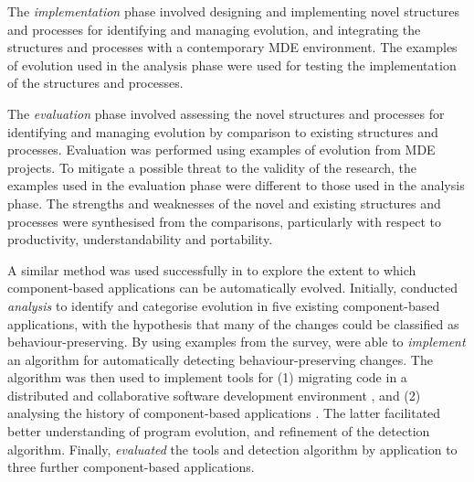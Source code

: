 The \emph{implementation} phase involved designing and implementing novel structures and processes for identifying and managing evolution, and integrating the structures and processes with a contemporary MDE environment. The examples of evolution used in the analysis phase were used for testing the implementation of the structures and processes.

The \emph{evaluation} phase involved assessing the novel structures and processes for identifying and managing evolution by comparison to existing structures and processes. Evaluation was performed using examples of evolution from MDE projects. To mitigate a possible threat to the validity of the research, the examples used in the evaluation phase were different to those used in the analysis phase. The strengths and weaknesses of the novel and existing structures and processes were synthesised from the comparisons, particularly with respect to productivity, understandability and portability.

A similar method was used successfully in \cite{dig07thesis} to explore the extent to which component-based applications can be automatically evolved. Initially, \cite{dig06apis} conducted \emph{analysis} to identify and categorise evolution in five existing component-based applications, with the hypothesis that many of the changes could be classified as behaviour-preserving. By using examples from the survey, \cite{dig06detection} were able to \emph{implement} an algorithm for automatically detecting behaviour-preserving changes. The algorithm was then used to implement tools for (1) migrating code in a distributed and collaborative software development environment \cite{dig06automatic}, and (2) analysing the history of component-based applications \cite{dig07cms}. The latter facilitated better understanding of program evolution, and refinement of the detection algorithm. Finally, \cite{dig07thesis} \emph{evaluated} the tools and detection algorithm by application to three further component-based applications.